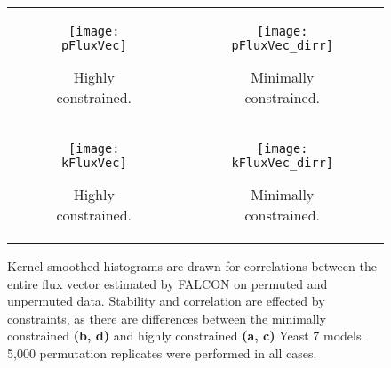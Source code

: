 \begin{figure}[!htb]
\centering
\begin{tabular}{cc}
  \begin{subfigure}[b]{0.5\textwidth}
  \texttt{[image: pFluxVec]}
  \caption{Highly constrained.} \label{fig:YpermCorrSup:A}
  \end{subfigure}
&
  \begin{subfigure}[b]{0.5\textwidth}
  \texttt{[image: pFluxVec\_dirr]}
  \caption{Minimally constrained.} \label{fig:YpermCorrSup:B}
  \end{subfigure} 
\\
  \begin{subfigure}[b]{0.5\textwidth}
  \texttt{[image: kFluxVec]}
  \caption{Highly constrained.} \label{fig:YpermCorrSup:C}
  \end{subfigure}
&
  \begin{subfigure}[b]{0.5\textwidth}
  \texttt{[image: kFluxVec\_dirr]}
  \caption{Minimally constrained.} \label{fig:YpermCorrSup:D}
  \end{subfigure} 
\\
\end{tabular}
\vspace{-4mm}
\caption{Kernel-smoothed histograms are drawn for correlations between
the entire flux vector estimated by FALCON on permuted and unpermuted
data. Stability and correlation are effected by constraints, as there
are differences between the minimally constrained \textbf{(b, d)} and
highly constrained \textbf{(a, c)} Yeast 7 models. 5,000 permutation
replicates were performed in all cases.}
\label{fig:YpermCorrSup}
\end{figure}
\FloatBarrier

